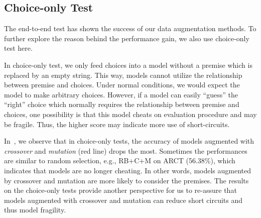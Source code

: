 


\subsection{Choice-only Test}
\label{sec:choice-only}

The end-to-end test has shown the success of our data augmentation 
methods. To further explore the reason behind the performance gain, 
we also use choice-only test here.

In choice-only test, we only feed choices into a model without a premise which is replaced 
by an empty string. This way, 
models cannot utilize the relationship between premise and choices. 
Under normal conditions, we would expect the model to make arbitrary choices.
However, if a model can easily ``guess'' the ``right'' choice which 
normally requires the relationship between premise and choices,  
one possibility is that this model cheats on evaluation procedure and 
may be fragile. Thus, the higher score may indicate more use of short-circuits.

In~, we observe that in choice-only tests,
the accuracy of models augmented with \textit{crossover} and \textit{mutation} 
(red line) drops the most. 
Sometimes the performances are similar to random selection, e.g., 
RB+C+M on ARCT (56.38\%), which indicates that models 
are no longer cheating. 
In other words, models augmented by crossover and mutation 
are more likely to consider the premises. 
The results on the choice-only tests provide another perspective for us
to re-assure that models augmented with crossover and mutation can reduce
short circuits and thus model fragility.

